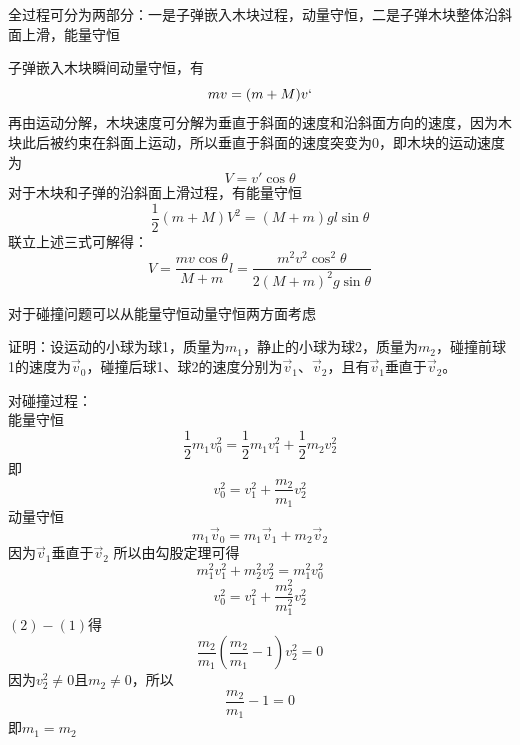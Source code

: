 \documentclass[b5paper,opensource]{qyxf-book}
\begin{document}

\analysis 全过程可分为两部分：一是子弹嵌入木块过程，动量守恒，二是子弹木块整体沿斜面上滑，能量守恒

\solve 子弹嵌入木块瞬间动量守恒，有
\begin{equation*}
mv=(m+M)v`
\end{equation*}
再由运动分解，木块速度可分解为垂直于斜面的速度和沿斜面方向的速度，因为木块此后被约束在斜面上运动，所以垂直于斜面的速度突变为$0$，即木块的运动速度为
\begin{equation*}
V=v'\cos\theta
\end{equation*}
对于木块和子弹的沿斜面上滑过程，有能量守恒
\begin{equation*}
\frac{1}{2}(m+M)V^2=(M+m)gl\sin\theta
\end{equation*}
联立上述三式可解得：
\begin{equation*}
V=\frac{mv\cos\theta}{M+m}
l=\frac{m^2v^2\cos^2\theta}{2(M+m)^2g\sin\theta}
\end{equation*}


\analysis 对于碰撞问题可以从能量守恒动量守恒两方面考虑

证明：设运动的小球为球1，质量为$m_1$，静止的小球为球2，质量为$m_2$，碰撞前球1的速度为$\vec{v}_0$，碰撞后球1、球2的速度分别为$\vec{v}_1、\vec{v}_2$，且有$\vec{v}_1$垂直于$\vec{v}_2$。
			
对碰撞过程：\\能量守恒
\begin{equation*}
\frac{1}{2}m_1v_0^2=\frac{1}{2}m_1v_1^2+\frac{1}{2}m_2v_2^2
\end{equation*}
即
\begin{equation}
v_0^2=v_1^2+\frac{m_2}{m_1}v_2^2
\end{equation}
动量守恒
\begin{equation*}
m_1\vec{v}_0=m_1\vec{v}_1+m_2\vec{v}_2
\end{equation*}
因为$\vec{v}_1$垂直于$\vec{v}_2$
所以由勾股定理可得
\begin{equation*}
m_1^2 v_1^2 + m_2^2 v_2^2 = m_1^2 v_0^2
\end{equation*}
\begin{equation}
v_0^2=v_1^2+\frac{m_2^2}{m_1^2}v_2^2
\end{equation}
$(2)-(1)$得
\begin{equation*}
\frac{m_2}{m_1}(\frac{m_2}{m_1}-1)v_2^2=0
\end{equation*}
因为$v_2^2 \ne 0$且$m_2 \ne 0$，所以
\begin{equation*}
\frac{m_2}{m_1}-1=0
\end{equation*}
即$m_1=m_2$
\end{document}
